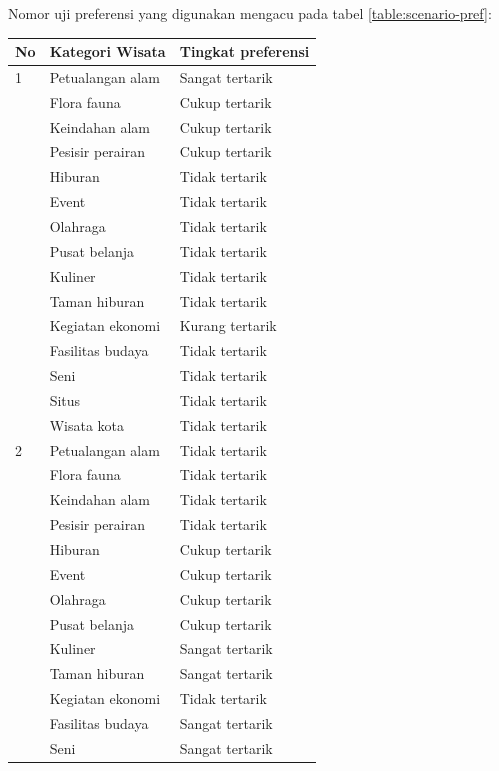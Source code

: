 \par
Nomor uji preferensi yang digunakan mengacu pada tabel \ref{table:scenario-pref}:
\begin{center}
\footnotesize
\begin{longtable}{ |l|l|l| } 
\hline
\textbf{No} & \textbf{Kategori Wisata} & \textbf{Tingkat preferensi} \\
\hline
				1	&	Petualangan alam	& Sangat tertarik \\
					&	Flora fauna			& Cukup tertarik \\
					&	Keindahan alam		& Cukup tertarik \\
					&	Pesisir perairan	& Cukup tertarik \\
					&	Hiburan				& Tidak tertarik \\
					&	Event				& Tidak tertarik \\
					&	Olahraga			& Tidak tertarik \\
					&	Pusat belanja		& Tidak tertarik \\
					&	Kuliner				& Tidak tertarik \\
					&	Taman hiburan		& Tidak tertarik \\
					&	Kegiatan ekonomi	& Kurang tertarik \\
					&	Fasilitas budaya	& Tidak tertarik \\
					&	Seni				& Tidak tertarik \\
					&	Situs				& Tidak tertarik \\
					&	Wisata kota			& Tidak tertarik \\
\hline
				2	&	Petualangan alam	& Tidak tertarik \\
					&	Flora fauna			& Tidak tertarik \\
					&	Keindahan alam		& Tidak tertarik \\
					&	Pesisir perairan	& Tidak tertarik \\
					&	Hiburan				& Cukup tertarik \\
					&	Event				& Cukup tertarik \\
					&	Olahraga			& Cukup tertarik \\
					&	Pusat belanja		& Cukup tertarik \\
					&	Kuliner				& Sangat tertarik \\
					&	Taman hiburan		& Sangat tertarik \\
					&	Kegiatan ekonomi	& Tidak tertarik \\
					&	Fasilitas budaya	& Sangat tertarik \\
					&	Seni				& Sangat tertarik \\

\end{longtable}
\end{center}
